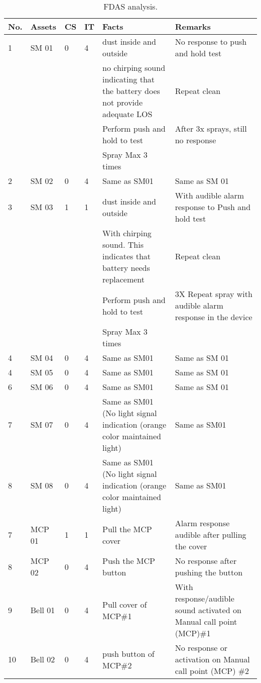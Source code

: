 \begin{table}[!h]
	\caption{FDAS analysis.}
	\label{ch05_tbl_fdas01}
	{\scriptsize
		\begin{tabular}{l|l|l|l|p{5cm}|p{5cm}}
\hline
No. & Assets & CS & IT & Facts & Remarks \\ 
\hline
1 & SM 01 & 0 & 4 & dust inside and outside & No response to push and hold test \\ 
&  &  &  & no chirping sound indicating that the battery does not provide adequate LOS & Repeat clean \\ 
&  &  &  & Perform push and hold to test & After 3x sprays, still no response \\ 
&  &  &  & Spray Max 3 times &  \\ 
\hline
2 & SM 02 & 0 & 4 & Same as SM01 & Same as SM 01 \\ 
\hline
3 & SM 03 & 1 & 1 & dust inside and outside & With audible alarm response to Push and hold test   \\ 
&  &  &  & With chirping sound. This indicates that battery needs replacement & Repeat clean \\ 
&  &  &  & Perform push and hold to test & 3X Repeat spray with audible alarm response in the device \\ 
&  &  &  & Spray Max 3 times &  \\ 
\hline
4 & SM 04 & 0 & 4 & Same as SM01 & Same as SM 01 \\ 
\hline
4 & SM 05 & 0 & 4 & Same as SM01 & Same as SM 01 \\ 
\hline
6 & SM 06 & 0 & 4 & Same as SM01 & Same as SM 01 \\ 
\hline
7 & SM 07 & 0 & 4 & Same as SM01 (No light signal indication (orange color maintained light) & Same as SM01 \\ 
\hline
8 & SM 08 & 0 & 4 & Same as SM01 (No light signal indication (orange color maintained light) & Same as SM01 \\ 
\hline
7 & MCP 01 & 1 & 1 & Pull the MCP  cover & Alarm response audible after pulling  the cover \\ 
\hline
8 & MCP 02 & 0 & 4 & Push the MCP  button & No response after pushing the button \\ 
\hline
9 & Bell 01 & 0 & 4 & Pull cover of MCP\#1 & With response/audible sound activated on Manual call point (MCP)\#1 \\ 
\hline
10 & Bell 02 & 0 & 4 & push button of MCP\#2 & No response or activation  on Manual call point (MCP) \#2 \\ 
\hline
		\end{tabular}
		
	}
\end{table}



